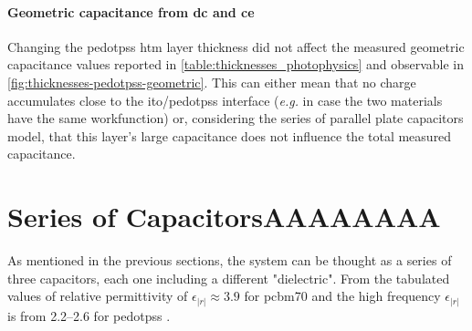 \paragraph{Geometric capacitance from \gls{dc} and \gls{ce}}
Changing the \gls{pedotpss} \gls{htm} layer thickness did not affect the measured geometric capacitance values reported in \cref{table:thicknesses_photophysics} and observable in \cref{fig:thicknesses-pedotpss-geometric}.
This can either mean that no charge accumulates close to the \gls{ito}\-/\gls{pedotpss} interface (\textsl{e.g.} in case the two materials have the same workfunction) or, considering the series of parallel plate capacitors model, that this layer's large capacitance does not influence the total measured capacitance.

\section{Series of CapacitorsAAAAAAAA}

As mentioned in the previous sections, the system can be thought as a series of three capacitors, each one including a different "dielectric".
From the tabulated values of relative permittivity of $\epsilon_|r|\approx3.9$ for \gls{pcbm70} \cite{Torabi2015} and the high frequency $\epsilon_|r|$ is from \SIrange{2.2}{2.6}{} for \gls{pedotpss} \cite{Rutledge2013,Yamashita2011}.




